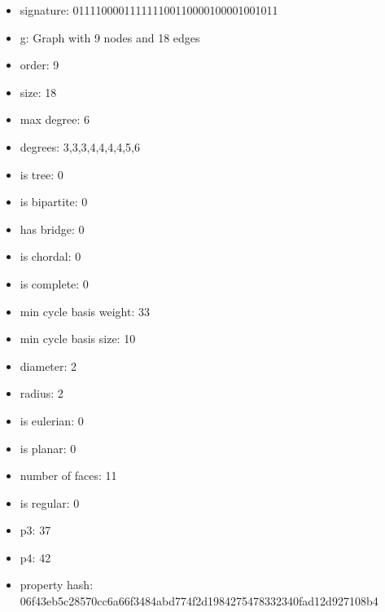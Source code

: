\newpage
\begin{figure}
\end{figure}
\begin{itemize}
\item signature: 011110000111111100110000100001001011
\item g: Graph with 9 nodes and 18 edges
\item order: 9
\item size: 18
\item max degree: 6
\item degrees: 3,3,3,4,4,4,4,5,6
\item is tree: 0
\item is bipartite: 0
\item has bridge: 0
\item is chordal: 0
\item is complete: 0
\item min cycle basis weight: 33
\item min cycle basis size: 10
\item diameter: 2
\item radius: 2
\item is eulerian: 0
\item is planar: 0
\item number of faces: 11
\item is regular: 0
\item p3: 37
\item p4: 42
\item property hash: 06f43eb5c28570cc6a66f3484abd774f2d1984275478332340fad12d927108b4
\end{itemize}
